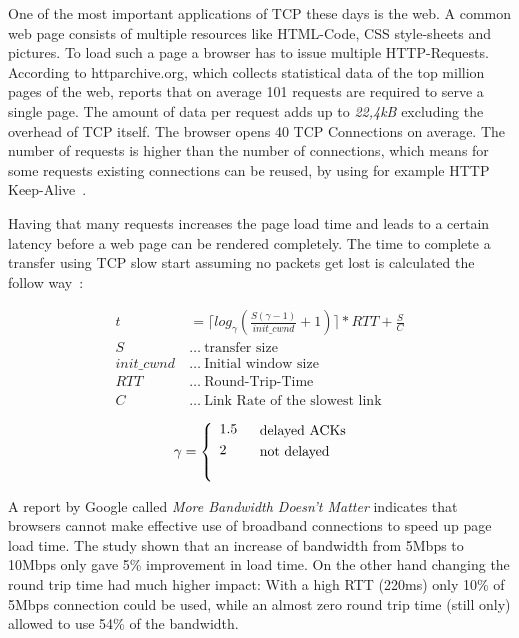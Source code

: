 One of the most important applications of TCP these days is the web. A common
web page consists of multiple resources like HTML-Code, CSS style-sheets and
pictures. To load such a page a browser has to issue multiple HTTP-Requests.
According to httparchive.org\cite{httparchive}, which collects statistical data
of the top million pages of the web, reports that on average 101 requests are
required to serve a single page\cite{httparchive-trends}. The amount of data per
request adds up to \emph{22,4kB} excluding the overhead of TCP itself. The
browser opens 40 TCP Connections on average. The number of requests is higher
than the number of connections, which means for some requests existing
connections can be reused, by using for example HTTP
Keep-Alive~\cite{I-D.thomson-hybi-http-timeout}.

Having that many requests increases the page load time and leads to a certain
latency before a web page can be rendered completely. The time to complete a
transfer using TCP slow start assuming no packets get lost is calculated the
follow way~\cite{832574}:

\begin{align}
  t&=\lceil log_{\gamma} (\frac{S(\gamma - 1)}{init\_cwnd} + 1) \rceil * RTT +
  \frac{S}{C} \label{loadtime}\\\label{transfer_time}
  S~&\dots~\text{transfer size } \\\nonumber
  init\_cwnd~&\dots~\text{Initial window size} \\\nonumber
  RTT~&\dots~\text{Round-Trip-Time} \\\nonumber
  C~&\dots~\text{Link Rate of the slowest link} \\\nonumber
\end{align}
\begin{align}
  & && \text{delayed ACKs} \nonumber \\
  \gamma &=
    \smash{\left\{\begin{array}{lr}
       1.5 \\[\jot]
       2 \\\nonumber
       \vspace{0.5em}
   \end{array}\right.} && \text{not delayed} \\\nonumber
\end{align}

A report by Google called \emph{More Bandwidth Doesn't Matter}\cite{bandwith}
indicates that browsers cannot make effective use of broadband connections to
speed up page load time. The study shown that an increase of bandwidth from
5Mbps to 10Mbps only gave 5\% improvement in load time. On the other hand
changing the round trip time had much higher impact: With a high RTT (220ms)
only 10\% of 5Mbps connection could be used, while an almost zero round trip
time (still only) allowed to use 54\% of the bandwidth.

